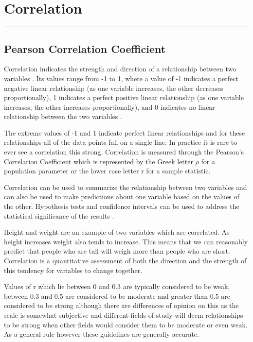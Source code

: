 \documentclass[
]{book}
\begin{document}
\hypertarget{correlationchapter}{%
\chapter{Correlation}\label{correlationchapter}}

\begin{center}\rule{0.5\linewidth}{0.5pt}\end{center}

\hypertarget{pearson-correlation-coefficient}{%
\section{Pearson Correlation Coefficient}\label{pearson-correlation-coefficient}}

Correlation indicates the strength and direction of a relationship between two variables \citep{schober}. Its values range from -1 to 1, where a value of -1 indicates a perfect negative linear relationship (as one variable increases, the other decreases proportionally), 1 indicates a perfect positive linear relationship (as one variable increases, the other increases proportionally), and 0 indicates no linear relationship between the two variables \citep{swinscow2}.

The extreme values of -1 and 1 indicate perfect linear relationships and for these relationships all of the data points fall on a single line. In practice it is rare to ever see a correlation this strong. Correlation is measured through the Pearson's Correlation Coefficient which is represented by the Greek letter \(\rho\) for a population parameter or the lower case letter r for a sample statistic.

Correlation can be used to summarize the relationship between two variables and can also be used to make predictions about one variable based on the values of the other. Hypothesis tests and confidence intervals can be used to address the statistical significance of the results \citep{schober}.

Height and weight are an example of two variables which are correlated. As height increases weight also tends to increase. This means that we can reasonably predict that people who are tall will weigh more than people who are short. Correlation is a quantitative assessment of both the direction and the strength of this tendency for variables to change together.

Values of r which lie between 0 and 0.3 are typically considered to be weak, between 0.3 and 0.5 are considered to be moderate and greater than 0.5 are considered to be strong although there are differences of opinion on this as the scale is somewhat subjective and different fields of study will deem relationships to be strong when other fields would consider them to be moderate or even weak. As a general rule however these guidelines are generally accurate.
\end{document}
